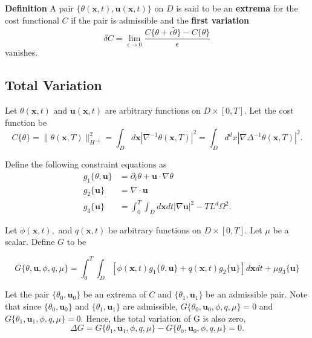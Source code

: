 \documentclass[11pt]{article}
\def \iint {\int_{0}^{T}\int_{D}}
\begin{document}
\vspace{1cm}

\noindent

\noindent \textbf{Definition} A pair $\{\theta(\mathbf{x},t), \mathbf{u}(\mathbf{x},t)\}$ on $D$ is said to be an \textbf{extrema} for the cost functional $C$ if the pair is admissible and the \textbf{first variation}
\[\delta C=\lim_{\epsilon\rightarrow0}\frac{C\{\theta+\epsilon\tilde{\theta}\}-C\{\theta\}}{\epsilon} \] vanishes.

\vspace{1cm}

\subsection{Total Variation}

\begin{flushleft}

Let $\theta(\mathbf{x},t)$ and $\mathbf{u}(\mathbf{x},t)$ are arbitrary functions on $D \times [0,T]$. Let the cost function be
\[
C\{\theta\}=\| \theta(\mathbf{x},T)\|^{2}_{H^{-1}}=\int_{D}d\mathbf{x} |\nabla^{-1} \theta(\mathbf{x},T)|^{2}=\int_{D}d^{d}x |\nabla\Delta^{-1} \theta(\mathbf{x},T)|^{2}.
\]

Define the following constraint equations as
\begin{align*}
g_{1}\{\theta,\mathbf{u}\} &= \partial_{t}\theta+\mathbf{u}\cdot \nabla \theta \\
g_{2}\{\mathbf{u}\} &= \nabla\cdot \mathbf{u} \\
g_{3}\{\mathbf{u}\} &= \int_{0}^{T}\int_{D}d\mathbf{x}dt |\nabla \mathbf{u}|^{2}-TL^{d}\Omega^{2}.
\end{align*}

Let $\phi(\mathbf{x},t),$ and $ q(\mathbf{x},t)$ be arbitrary functions on $D \times [0,T]$. Let $\mu$ be a scalar. Define $G$ to be 

\[G\{\theta,\mathbf{u},\phi,q,\mu\}=\iint [\phi(\mathbf{x},t) g_{1}\{\theta,\mathbf{u}\} + q(\mathbf{x},t) g_{2}\{\mathbf{u}\}]d\mathbf{x}dt+\mu g_{3}\{\mathbf{u}\}\]

Let the pair $\{\theta_{0},\mathbf{u}_{0}\}$ be an extrema of $C$ and $\{\theta_{1},\mathbf{u}_{1}\}$ be an admissible pair. Note that since $\{\theta_{0},\mathbf{u}_{0}\}$ and $\{\theta_{1},\mathbf{u}_{1}\}$ are admissible, $G\{\theta_{0},\mathbf{u}_{0},\phi,q,\mu\}=0$ and $G\{\theta_{1},\mathbf{u}_{1},\phi,q,\mu\}=0$. Hence, the total variation of G is also zero,
\[\Delta G= G\{\theta_{1},\mathbf{u}_{1},\phi,q,\mu\}-G\{\theta_{0},\mathbf{u}_{0},\phi,q,\mu\}=0.\]



\end{flushleft}
\end{document}

